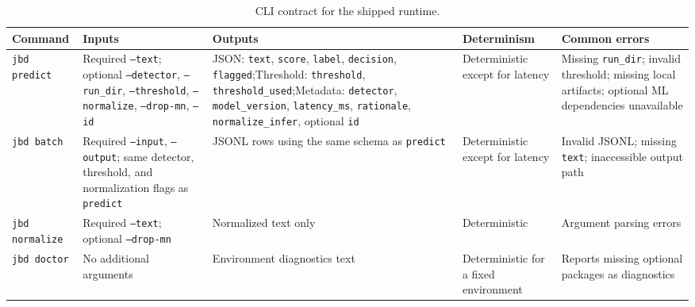 \begin{table}[t]
\centering
\caption{CLI contract for the shipped runtime.}
\label{tab:cli_contract}
\scriptsize
\setlength{\tabcolsep}{4pt}
\renewcommand{\arraystretch}{1.12}
\begin{tabularx}{\textwidth}{p{}p{}p{}p{}X}
\toprule
Command & Inputs & Outputs & Determinism & Common errors \\
\midrule
\texttt{jbd predict} & Required \texttt{--text}; optional \texttt{--detector}, \texttt{--run\_dir}, \texttt{--threshold}, \texttt{--normalize}, \texttt{--drop-mn}, \texttt{--id} & JSON: \texttt{text}, \texttt{score}, \texttt{label}, \texttt{decision}, \texttt{flagged};\newline Threshold: \texttt{threshold}, \texttt{threshold\_used};\newline Metadata: \texttt{detector}, \texttt{model\_version}, \texttt{latency\_ms}, \texttt{rationale}, \texttt{normalize\_infer}, optional \texttt{id} & Deterministic except for latency & Missing \texttt{run\_dir}; invalid threshold; missing local artifacts; optional ML dependencies unavailable \\
\texttt{jbd batch} & Required \texttt{--input}, \texttt{--output}; same detector, threshold, and normalization flags as \texttt{predict} & JSONL rows using the same schema as \texttt{predict} & Deterministic except for latency & Invalid JSONL; missing \texttt{text}; inaccessible output path \\
\texttt{jbd normalize} & Required \texttt{--text}; optional \texttt{--drop-mn} & Normalized text only & Deterministic & Argument parsing errors \\
\texttt{jbd doctor} & No additional arguments & Environment diagnostics text & Deterministic for a fixed environment & Reports missing optional packages as diagnostics \\
\bottomrule
\end{tabularx}
\setlength{\tabcolsep}{6pt}
\renewcommand{\arraystretch}{1}
\normalsize
\end{table}
